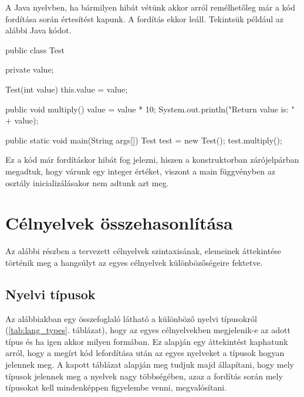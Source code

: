 A Java nyelvben, ha bármilyen hibát vétünk akkor arról remélhetőleg már a kód fordítása során értesítést kapunk. A fordítás ekkor leáll. Tekintsük például az alábbi Java kódot.
\begin{java}
public class Test {
    private value;
    
    Test(int value) {
        this.value = value;
    }

   public void multiply() {
      value = value * 10;
      System.out.println("Return value is: " + value);
   }

   public static void main(String args[]) {
      Test test = new Test();
      test.multiply();
   }
}
\end{java}

Ez a kód már fordításkor hibát fog jelezni, hiszen a konstruktorban zárójelpárban megadtuk, hogy várunk egy integer értéket, viszont a main függvényben az osztály inicializálásakor nem adtunk azt meg. 

\section{Célnyelvek összehasonlítása}

Az alábbi részben a tervezett célnyelvek szintaxisának, elemeinek áttekintése történik meg a hangsúlyt az egyes célnyelvek különbözőségeire fektetve.

\subsection{Nyelvi típusok}

Az alábbiakban egy összefoglaló látható a különböző nyelvi típusokról (\ref{tab:lang_types}. táblázat), hogy az egyes célnyelvekben megjelenik-e az adott típus és ha igen akkor milyen formában. Ez alapján egy áttekintést kaphatunk arról, hogy a megírt kód lefordítása után az egyes nyelveket a típusok hogyan jelennek meg.
A kapott táblázat alapján meg tudjuk majd állapítani, hogy mely típusok jelennek meg a nyelvek nagy többségében, azaz a fordítás során mely típusokat kell mindenképpen figyelembe venni, megvalósítani.

